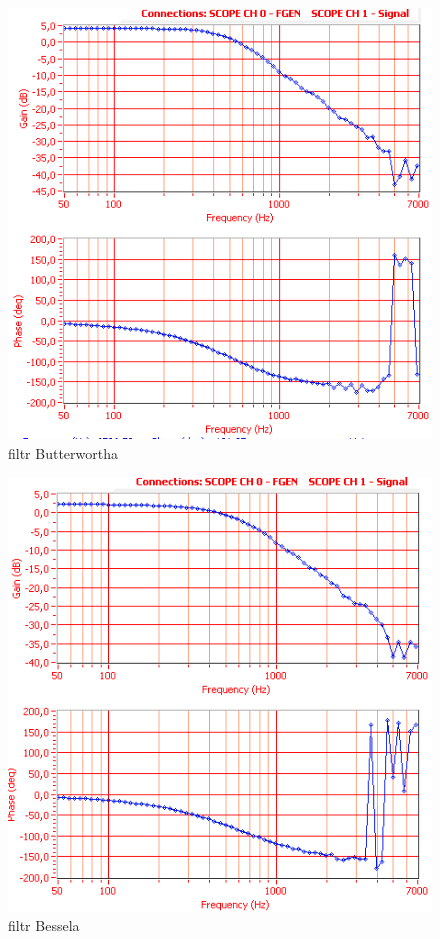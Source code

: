 \documentclass[a4paper,11pt]{article}
\begin{document}
\begin{figure}[H]
\begin{center}
\includegraphics{obrazki/batman1.PNG}
\end{center}
\caption{filtr Butterwortha}
\end{figure}

\begin{figure}[H]
\begin{center}
\includegraphics{obrazki/belzebub1bialy.png}
\end{center}
\caption{filtr Bessela}
\end{figure}
\end{document}
